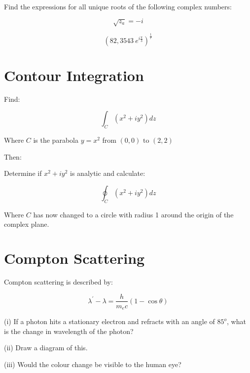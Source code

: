 \documentclass{article}
\begin{document}
Find the expressions for all unique roots of the following complex numbers:

\begin{equation}
  \sqrt{z_{a}} = -i
\end{equation}

\begin{equation}
  \left( 82,3543 \ e^{i \frac{\pi}{3}} \right)^{\frac{1}{7}}
\end{equation}

\clearpage
\section{Contour Integration}

Find:

\begin{equation}
  \int^{}_{C} \left( x^2 + i y^2 \right) dz
\end{equation}

Where $C$ is the parabola $y = x^{2}_{}$ from $(0,0) \text{ to } (2,2)$

\vspace{0.5cm}

Then:

Determine if $x^2 + iy^2$ is analytic and calculate:

\begin{equation}
  \oint^{}_{C} \left( x^2 + i y^2 \right) dz 
\end{equation}

Where $C$ has now changed to a circle with radius 1 around the origin of the 
complex plane. 
\clearpage
\section{Compton Scattering}

Compton scattering is described by:

\begin{equation}
  \lambda^{'}_{} - \lambda = \frac{h}{m_{e} c} \left( 1 - \cos\theta  \right)
\end{equation}

(i) If a photon hits a stationary electron and refracts with an angle of $85^{o}$, 
what is the change in wavelength of the photon?

(ii) Draw a diagram of this.

(iii) Would the colour change be visible to the human eye?
\end{document}
